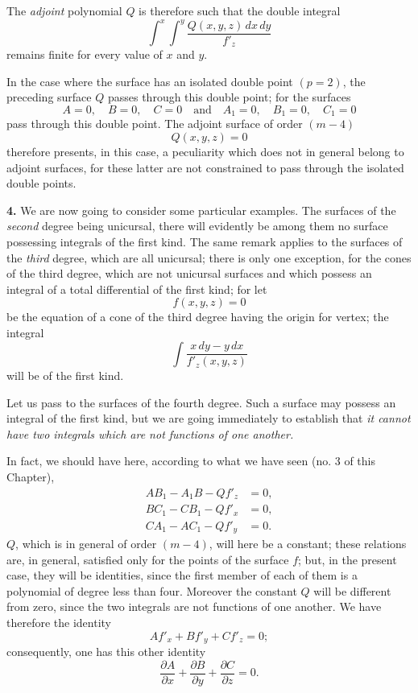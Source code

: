 \documentclass{article}
\begin{document}

The \emph{adjoint} polynomial $Q$ is therefore such that the double integral
\[
\int^{x} \int^{y} \frac{Q(x, y, z)\,dx\,dy}{f'_{z}}
\]
remains finite for every value of $x$ and $y$.

In the case where the surface has an isolated double point $(p = 2)$, the preceding surface $Q$ passes through this double point; for the surfaces
\[
A = 0, \quad B = 0, \quad C = 0 \quad \text{and} \quad A_{1} = 0, \quad B_{1} = 0, \quad C_{1} = 0
\]
pass through this double point. The adjoint surface of order $(m - 4)$
\[
Q(x, y, z) = 0
\]
therefore presents, in this case, a peculiarity which does not in general belong to adjoint surfaces, for these latter are not constrained to pass through the isolated double points.

\textbf{4.} We are now going to consider some particular examples. The surfaces of the \emph{second} degree being unicursal, there will evidently be among them no surface possessing integrals of the first kind. The same remark applies to the surfaces of the \emph{third} degree, which are all unicursal; there is only one exception, for the cones of the third degree, which are not unicursal surfaces and which possess an integral of a total differential of the first kind; for let
\[
f(x, y, z) = 0
\]
be the equation of a cone of the third degree having the origin for vertex; the integral
\[
\int \frac{x\,dy - y\,dx}{f'_{z}(x, y, z)}
\]
will be of the first kind.

Let us pass to the surfaces of the fourth degree. Such a surface may possess an integral of the first kind, but we are going immediately to establish that \emph{it cannot have two integrals which are not functions of one another.}


In fact, we should have here, according to what we have seen (no. 3 of this Chapter),
\[
\begin{aligned}
AB_{1} - A_{1}B - Qf'_{z} &= 0, \\
BC_{1} - CB_{1} - Qf'_{x} &= 0, \\
CA_{1} - AC_{1} - Qf'_{y} &= 0.
\end{aligned}
\]
$Q$, which is in general of order $(m - 4)$, will here be a constant; these relations are, in general, satisfied only for the points of the surface $f$; but, in the present case, they will be identities, since the first member of each of them is a polynomial of degree less than four. Moreover the constant $Q$ will be different from zero, since the two integrals are not functions of one another. We have therefore the identity
\[
Af'_{x} + Bf'_{y} + Cf'_{z} = 0;
\]
consequently, one has this other identity
\[
\frac{\partial A}{\partial x} + \frac{\partial B}{\partial y} + \frac{\partial C}{\partial z} = 0.
\]
\end{document}
